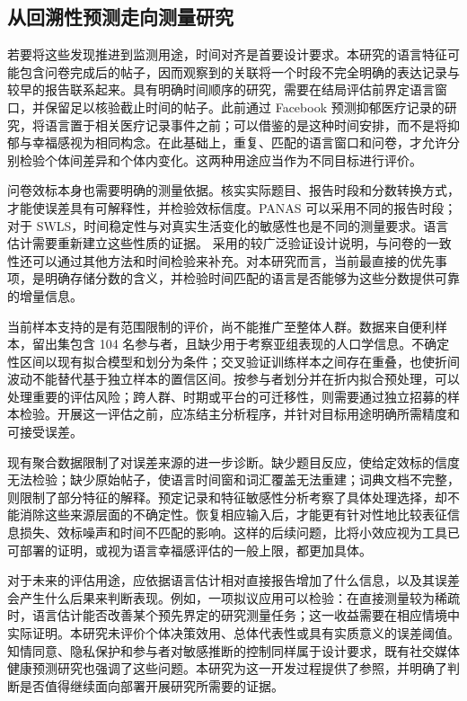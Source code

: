 \subsection{从回溯性预测走向测量研究}
若要将这些发现推进到监测用途，时间对齐是首要设计要求。本研究的语言特征可能包含问卷完成后的帖子，因而观察到的关联将一个时段不完全明确的表达记录与较早的报告联系起来。具有明确时间顺序的研究，需要在结局评估前界定语言窗口，并保留足以核验截止时间的帖子。此前通过 Facebook 预测抑郁医疗记录的研究，将语言置于相关医疗记录事件之前\citep{eichstaedt2018}；可以借鉴的是这种时间安排，而不是将抑郁与幸福感视为相同构念。在此基础上，重复、匹配的语言窗口和问卷，才允许分别检验个体间差异和个体内变化。这两种用途应当作为不同目标进行评价。

问卷效标本身也需要明确的测量依据。核实实际题目、报告时段和分数转换方式，才能使误差具有可解释性，并检验效标信度。PANAS 可以采用不同的报告时段\citep{watson1988}；对于 SWLS，时间稳定性与对真实生活变化的敏感性也是不同的测量要求\citep{pavot1993}。语言估计需要重新建立这些性质的证据。\citet{park2015} 采用的较广泛验证设计说明，与问卷的一致性还可以通过其他方法和时间检验来补充。对本研究而言，当前最直接的优先事项，是明确存储分数的含义，并检验时间匹配的语言是否能够为这些分数提供可靠的增量信息。

当前样本支持的是有范围限制的评价，尚不能推广至整体人群。数据来自便利样本，留出集包含 104 名参与者，且缺少用于考察亚组表现的人口学信息。不确定性区间以现有拟合模型和划分为条件；交叉验证训练样本之间存在重叠，也使折间波动不能替代基于独立样本的置信区间\citep{varoquaux2018}。按参与者划分并在折内拟合预处理，可以处理重要的评估风险\citep{kapoor2023}；跨人群、时期或平台的可迁移性，则需要通过独立招募的样本检验。开展这一评估之前，应冻结主分析程序，并针对目标用途明确所需精度和可接受误差。

现有聚合数据限制了对误差来源的进一步诊断。缺少题目反应，使给定效标的信度无法检验；缺少原始帖子，使语言时间窗和词汇覆盖无法重建；词典文档不完整，则限制了部分特征的解释。预定记录和特征敏感性分析考察了具体处理选择，却不能消除这些来源层面的不确定性。恢复相应输入后，才能更有针对性地比较表征信息损失、效标噪声和时间不匹配的影响。这样的后续问题，比将小效应视为工具已可部署的证明，或视为语言幸福感评估的一般上限，都更加具体。

对于未来的评估用途，应依据语言估计相对直接报告增加了什么信息，以及其误差会产生什么后果来判断表现。例如，一项拟议应用可以检验：在直接测量较为稀疏时，语言估计能否改善某个预先界定的研究测量任务；这一收益需要在相应情境中实际证明。本研究未评价个体决策效用、总体代表性或具有实质意义的误差阈值。知情同意、隐私保护和参与者对敏感推断的控制同样属于设计要求，既有社交媒体健康预测研究也强调了这些问题\citep{eichstaedt2018}。本研究为这一开发过程提供了参照，并明确了判断是否值得继续面向部署开展研究所需要的证据。

